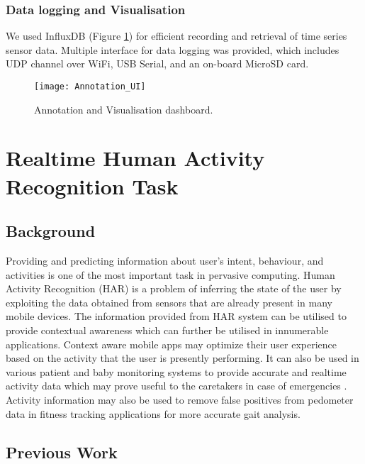\documentclass[
10pt,           %
a4paper,        %
oneside,        %
headinclude,footinclude, %
]{scrartcl}
\begin{document}
\subsubsection{Data logging and Visualisation}
We used InfluxDB (Figure \ref{Annotation_UI}) for efficient recording and retrieval of time series sensor data. Multiple interface for data logging was provided, which includes UDP channel over WiFi, USB Serial, and an on-board MicroSD card.

\begin{figure}[h]
  \begin{center}
    \texttt{[image: Annotation\_UI]}
  \end{center}
  \vspace{-10pt}
  \caption{\label{Annotation_UI}Annotation and Visualisation dashboard.}
  \vspace{-10pt}
\end{figure}


\newpage
\section{Realtime Human Activity Recognition Task}

\subsection{Background}

Providing and predicting information about user's intent, behaviour, and activities is one of the most important task in pervasive computing. Human Activity Recognition (\gls{HAR}) is a problem of inferring the state of the user by exploiting the data obtained from sensors that are already present in many mobile devices. The information provided from \gls{HAR} system can be utilised to provide contextual awareness which can further be utilised in innumerable applications. Context aware mobile apps may optimize their user experience based on the activity that the user is presently performing. It can also be used in various patient and baby monitoring systems to provide accurate and realtime activity data which may prove useful to the caretakers in case of emergencies \cite{Anguita2013}. Activity information may also be used to remove false positives from pedometer data in fitness tracking applications for more accurate gait analysis.

\subsection{Previous Work}
\end{document}
